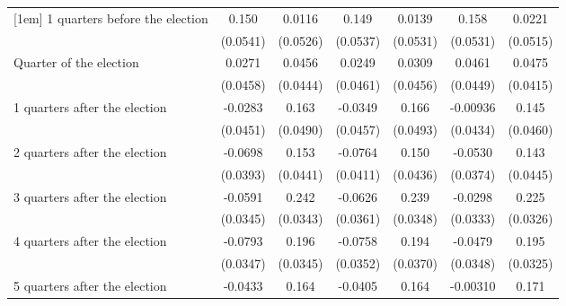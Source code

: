 \begin{table}[htbp]
\begin{tabular}{l*{6}{c}}
[1em]
 1 quarters before the election&       0.150\sym{**} &      0.0116         &       0.149\sym{**} &      0.0139         &       0.158\sym{**} &      0.0221         \\
                    &    (0.0541)         &    (0.0526)         &    (0.0537)         &    (0.0531)         &    (0.0531)         &    (0.0515)         \\
[1em]
Quarter of the election&      0.0271         &      0.0456         &      0.0249         &      0.0309         &      0.0461         &      0.0475         \\
                    &    (0.0458)         &    (0.0444)         &    (0.0461)         &    (0.0456)         &    (0.0449)         &    (0.0415)         \\
[1em]
 1 quarters after the election&     -0.0283         &       0.163\sym{***}&     -0.0349         &       0.166\sym{***}&    -0.00936         &       0.145\sym{**} \\
                    &    (0.0451)         &    (0.0490)         &    (0.0457)         &    (0.0493)         &    (0.0434)         &    (0.0460)         \\
[1em]
 2 quarters after the election&     -0.0698         &       0.153\sym{***}&     -0.0764         &       0.150\sym{***}&     -0.0530         &       0.143\sym{**} \\
                    &    (0.0393)         &    (0.0441)         &    (0.0411)         &    (0.0436)         &    (0.0374)         &    (0.0445)         \\
[1em]
 3 quarters after the election&     -0.0591         &       0.242\sym{***}&     -0.0626         &       0.239\sym{***}&     -0.0298         &       0.225\sym{***}\\
                    &    (0.0345)         &    (0.0343)         &    (0.0361)         &    (0.0348)         &    (0.0333)         &    (0.0326)         \\
[1em]
 4 quarters after the election&     -0.0793\sym{*}  &       0.196\sym{***}&     -0.0758\sym{*}  &       0.194\sym{***}&     -0.0479         &       0.195\sym{***}\\
                    &    (0.0347)         &    (0.0345)         &    (0.0352)         &    (0.0370)         &    (0.0348)         &    (0.0325)         \\
[1em]
 5 quarters after the election&     -0.0433         &       0.164\sym{***}&     -0.0405         &       0.164\sym{***}&    -0.00310         &       0.171\sym{***}\\

\end{tabular}
\end{table}
